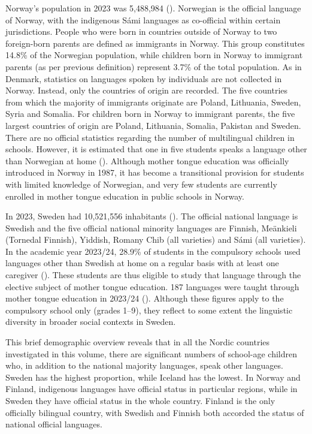 \documentclass[output=paper]{langscibook}
\begin{document}
Norway’s population in 2023 was 5,488,984 (\citealt{Statistics_norway2023}). Norwegian is the official language of Norway, with the indigenous Sámi languages as co-official within certain jurisdictions. People who were born in countries outside of Norway to two foreign-born parents are defined as immigrants in Norway. This group constitutes 14.8\% of the Norwegian population, while children born in Norway to immigrant parents (as per previous definition) represent 3.7\% of the total population. As in Denmark, statistics on languages spoken by individuals are not collected in Norway. Instead, only the countries of origin are recorded. The five countries from which the majority of immigrants originate are Poland, Lithuania, Sweden, Syria and Somalia. For children born in Norway to immigrant parents, the five largest countries of origin are Poland, Lithuania, Somalia, Pakistan and Sweden. There are no official statistics regarding the number of multilingual children in schools. However, it is estimated that one in five students speaks a language other than Norwegian at home (\citealt{Kulbrandstad2020}). Although mother tongue education was officially introduced in Norway in 1987, it has become a transitional provision for students with limited knowledge of Norwegian, and very few students are currently enrolled in mother tongue education in public schools in Norway.

In 2023, Sweden had 10,521,556 inhabitants (\citealt{Statistics_sweden2023}). The official national language is Swedish and the five official national minority languages are Finnish, Meänkieli (Tornedal Finnish), Yiddish, Romany Chib (all varieties) and Sámi (all varieties). In the academic year 2023/24, 28.9\% of students in the compulsory schools used languages other than Swedish at home on a regular basis with at least one caregiver (\citealt{Swedish_national_agency_of_education2024}). These students are thus eligible to study that language through the elective subject of mother tongue education. 187 languages were taught through mother tongue education in 2023\slash 24 (\citealt{Swedish_national_agency_of_education2024}). Although these figures apply to the compulsory school only (grades 1–9), they reflect to some extent the linguistic diversity in broader social contexts in Sweden.

This brief demographic overview reveals that in all the Nordic countries investigated in this volume, there are significant numbers of school-age children who, in addition to the national majority languages, speak other languages. Sweden has the highest proportion, while Iceland has the lowest. In Norway and Finland, indigenous languages have official status in particular regions, while in Sweden they have official status in the whole country. Finland is the only officially bilingual country, with Swedish and Finnish both accorded the status of national official languages.
\end{document}
